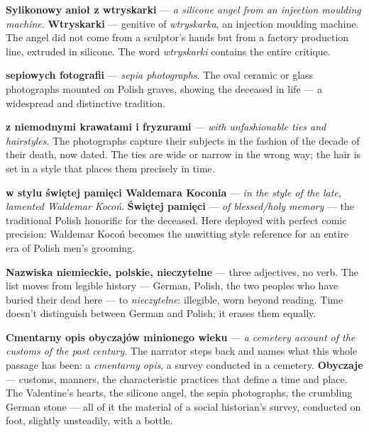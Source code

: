 \textbf{Sylikonowy anioł z wtryskarki} --- \textit{a silicone angel
from an injection moulding machine}. \textbf{Wtryskarki} --- genitive
of \textit{wtryskarka}, an injection moulding machine. The angel did
not come from a sculptor's hands but from a factory production line,
extruded in silicone. The word \textit{wtryskarki} contains the entire
critique.

\textbf{sepiowych fotografii} --- \textit{sepia photographs}. The oval
ceramic or glass photographs mounted on Polish graves, showing the
deceased in life --- a widespread and distinctive tradition.

\textbf{z niemodnymi krawatami i fryzurami} --- \textit{with
unfashionable ties and hairstyles}. The photographs capture their
subjects in the fashion of the decade of their death, now dated. The
ties are wide or narrow in the wrong way; the hair is set in a style
that places them precisely in time.

\textbf{w stylu świętej pamięci Waldemara Koconia} --- \textit{in the
style of the late, lamented Waldemar Kocoń}. \textbf{Świętej pamięci}
--- \textit{of blessed/holy memory} --- the traditional Polish
honorific for the deceased. Here deployed with perfect comic precision:
Waldemar Kocoń becomes the unwitting style reference for an entire era
of Polish men's grooming.



\textbf{Nazwiska niemieckie, polskie, nieczytelne} --- three adjectives,
no verb. The list moves from legible history --- German, Polish, the
two peoples who have buried their dead here --- to \textit{nieczytelne}:
illegible, worn beyond reading. Time doesn't distinguish between German
and Polish; it erases them equally.

\textbf{Cmentarny opis obyczajów minionego wieku} --- \textit{a
cemetery account of the customs of the past century}. The narrator
steps back and names what this whole passage has been: a
\textit{cmentarny opis}, a survey conducted in a cemetery.
\textbf{Obyczaje} --- customs, manners, the characteristic practices
that define a time and place. The Valentine's hearts, the silicone
angel, the sepia photographs, the crumbling German stone --- all of
it the material of a social historian's survey, conducted on foot,
slightly unsteadily, with a bottle.

